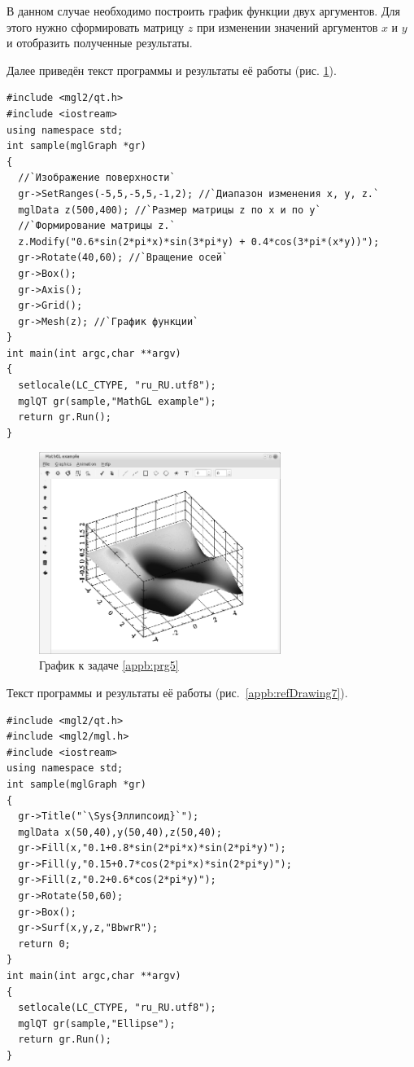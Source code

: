 В данном случае необходимо построить график функции двух аргументов. Для этого нужно сформировать матрицу $z$ при
изменении значений аргументов $x$ и $y$ и отобразить полученные результаты.

Далее приведён текст программы и результаты её работы (рис. \ref{appb:refDrawing6}).
\begin{lstlisting}
#include <mgl2/qt.h>
#include <iostream>
using namespace std;
int sample(mglGraph *gr)
{
  //`Изображение поверхности`
  gr->SetRanges(-5,5,-5,5,-1,2); //`Диапазон изменения x, y, z.`
  mglData z(500,400); //`Размер матрицы z по х и по y`
  //`Формирование матрицы z.`
  z.Modify("0.6*sin(2*pi*x)*sin(3*pi*y) + 0.4*cos(3*pi*(x*y))");
  gr->Rotate(40,60); //`Вращение осей`
  gr->Box(); 
  gr->Axis(); 
  gr->Grid();
  gr->Mesh(z); //`График функции`
}
int main(int argc,char **argv)
{
  setlocale(LC_CTYPE, "ru_RU.utf8");
  mglQT gr(sample,"MathGL example");
  return gr.Run();
}
\end{lstlisting}

\begin{figure}[htb]
\begin{center}
\includegraphics[width=0.7\textwidth]{img/ris_appb_7}
\caption{График к задаче \ref{appb:prg5}}
\label{appb:refDrawing6}
\end{center}
\end{figure}


Текст программы и результаты её работы (рис.~\ref{appb:refDrawing7}).
\begin{lstlisting}
#include <mgl2/qt.h>
#include <mgl2/mgl.h>
#include <iostream>
using namespace std;
int sample(mglGraph *gr)
{  
  gr->Title("`\Sys{Эллипсоид}`");
  mglData x(50,40),y(50,40),z(50,40);
  gr->Fill(x,"0.1+0.8*sin(2*pi*x)*sin(2*pi*y)");
  gr->Fill(y,"0.15+0.7*cos(2*pi*x)*sin(2*pi*y)");
  gr->Fill(z,"0.2+0.6*cos(2*pi*y)");
  gr->Rotate(50,60);
  gr->Box();
  gr->Surf(x,y,z,"BbwrR");
  return 0;
}
int main(int argc,char **argv)
{  
  setlocale(LC_CTYPE, "ru_RU.utf8");
  mglQT gr(sample,"Ellipse");
  return gr.Run();
}
\end{lstlisting}


